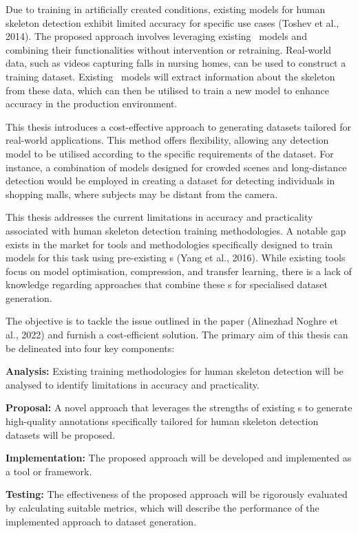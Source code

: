 Due to training in artificially created conditions, existing models for human skeleton detection exhibit limited accuracy for specific use cases (\scc Toshev et al., 2014). The proposed approach involves leveraging existing \NN\ models and combining their functionalities without intervention or retraining. Real-world data, such as videos capturing falls in nursing homes, can be used to construct a training dataset. Existing \NN\ models will extract information about the skeleton from these data, which can then be utilised to train a new model to enhance accuracy in the production environment.

This thesis introduces a cost-effective approach to generating datasets tai\-lored for real-world applications. This method offers flexibility, allowing any detection model to be utilised according to the specific requirements of the dataset. For instance, a combination of models designed for crowded scenes and long-distance detection would be employed in creating a dataset for detecting individuals in shopping malls, where subjects may be distant from the camera.

\page
{}
This thesis addresses the current limitations in accuracy and practicality associated with human skeleton detection training methodologies. A notable gap exists in the market for tools and methodologies specifically designed to train models for this task using pre-existing \NN\-s (\scc Yang et al., 2016). While existing tools focus on model optimisation, compression, and transfer learning, there is a lack of knowledge regarding approaches that combine these \NN\-s for specialised dataset generation.

The objective is to tackle the issue outlined in the paper (\scc Alinezhad Noghre et al., 2022) and furnish a cost-efficient solution. The primary aim of this thesis can be delineated into four key components:

\startitemize[n]
 \item {\bf Analysis:} Existing training methodologies for human skeleton detection will be analysed to identify limitations in accuracy and practicality.
 \item {\bf Proposal:} A novel approach that leverages the strengths of existing \NN\-s to generate high-quality annotations specifically tailored for human skeleton detection datasets will be proposed.
 \item {\bf Implementation:} The proposed approach will be developed and implemented as a tool or framework.
 \item {\bf Testing:} The effectiveness of the proposed approach will be rigorously evaluated by calculating suitable metrics, which will describe the performance of the implemented approach to dataset generation.
\stopitemize